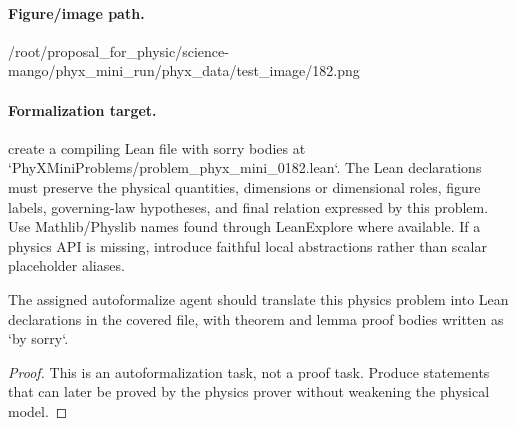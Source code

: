 \paragraph{Figure/image path.}
/root/proposal\_for\_physic/science-mango/phyx\_mini\_run/phyx\_data/test\_image/182.png

\paragraph{Formalization target.}
create a compiling Lean file with sorry bodies at `PhyXMiniProblems/problem\_phyx\_mini\_0182.lean`. The Lean declarations must preserve the physical quantities, dimensions or dimensional roles, figure labels, governing-law hypotheses, and final relation expressed by this problem.
Use Mathlib/Physlib names found through LeanExplore where available. If a physics API is missing, introduce faithful local abstractions rather than scalar placeholder aliases.

\begin{theorem}
\label{thm:physics:phyx_mini_0182:target}
The assigned autoformalize agent should translate this physics problem into Lean declarations in the covered file, with theorem and lemma proof bodies written as `by sorry`.
\end{theorem}
\begin{proof}
This is an autoformalization task, not a proof task. Produce statements that can later be proved by the physics prover without weakening the physical model.
\end{proof}


